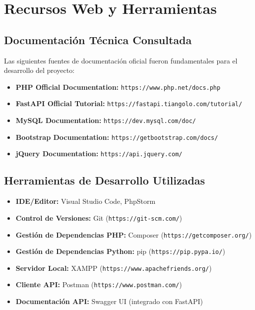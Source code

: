 \documentclass[conference]{IEEEtran}
\begin{document}
\section{Recursos Web y Herramientas}

\subsection{Documentación Técnica Consultada}
Las siguientes fuentes de documentación oficial fueron fundamentales para el desarrollo del proyecto:

\begin{itemize}
    \item \textbf{PHP Official Documentation:} \texttt{https://www.php.net/docs.php}
    \item \textbf{FastAPI Official Tutorial:} \texttt{https://fastapi.tiangolo.com/tutorial/}
    \item \textbf{MySQL Documentation:} \texttt{https://dev.mysql.com/doc/}
    \item \textbf{Bootstrap Documentation:} \texttt{https://getbootstrap.com/docs/}
    \item \textbf{jQuery Documentation:} \texttt{https://api.jquery.com/}
\end{itemize}

\subsection{Herramientas de Desarrollo Utilizadas}
\begin{itemize}
    \item \textbf{IDE/Editor:} Visual Studio Code, PhpStorm
    \item \textbf{Control de Versiones:} Git (\texttt{https://git-scm.com/})
    \item \textbf{Gestión de Dependencias PHP:} Composer (\texttt{https://getcomposer.org/})
    \item \textbf{Gestión de Dependencias Python:} pip (\texttt{https://pip.pypa.io/})
    \item \textbf{Servidor Local:} XAMPP (\texttt{https://www.apachefriends.org/})
    \item \textbf{Cliente API:} Postman (\texttt{https://www.postman.com/})
    \item \textbf{Documentación API:} Swagger UI (integrado con FastAPI)
\end{itemize}
\end{document}
